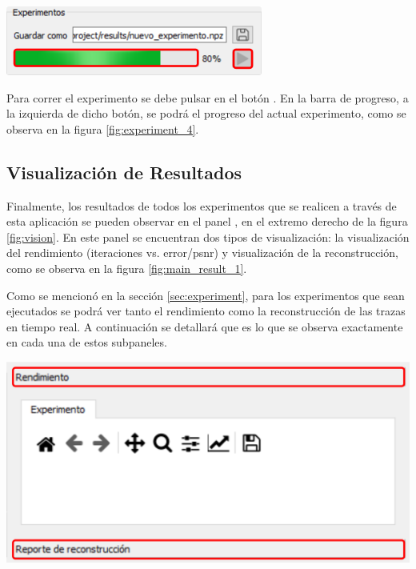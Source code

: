 \documentclass[12pt,twoside,letter]{ol-softwaremanual}
\newcommand*\circled[1]{\tikz[baseline=(char.base)]{
            \node[shape=circle,draw,inner sep=2pt] (char) {#1};}}
\newenvironment{Figure}
  {\par\medskip\noindent\minipage{\linewidth}}
  {\endminipage\par\medskip}
\begin{document}
\begin{multicols}{2}

\begin{Figure}
	\centering
	\includegraphics[width=0.7\linewidth]{experiment-4.png}
	\label{fig:experiment_4}
\end{Figure}

Para correr el experimento se debe pulsar en el botón \hspace{0.5mm} \faPlay \hspace{0.5mm}. En la barra de progreso, a la izquierda de dicho botón, se podrá el progreso del actual experimento, como se observa en la figura \ref{fig:experiment_4}.

\end{multicols}

\subsection{Visualización de Resultados}

Finalmente, los resultados de todos los experimentos que se realicen a través de esta aplicación se pueden observar en el panel \circled{7}, en el extremo derecho de la figura \ref{fig:vision}. En este panel se encuentran dos tipos de visualización: la visualización del rendimiento (iteraciones vs. error/psnr) y visualización de la reconstrucción, como se observa en la figura \ref{fig:main_result_1}.

\begin{multicols}{2}

Como se mencionó en la sección \ref{sec:experiment}, para los experimentos que sean ejecutados se podrá ver tanto el rendimiento como la reconstrucción de las trazas en tiempo real. A continuación se detallará que es lo que se observa exactamente en cada una de estos subpaneles.

\begin{Figure}
    \centering
    \includegraphics[width=0.7\linewidth]{main-result-1.png}
    \label{fig:main_result_1}
\end{Figure}

\end{multicols}
\end{document}
